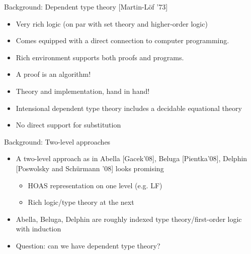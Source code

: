 \documentclass[usenames,dvipsnames]{beamer}
\begin{document}
\begin{frame}{Background: Dependent type theory [Martin-L\"of '73]}
\begin{itemize}
\item Very rich logic (on par with set theory and higher-order logic)
\item Comes equipped with a direct
connection to computer programming.
\item Rich environment supports both proofs and programs.
\item A proof is an algorithm!
\item Theory and implementation, hand in hand!
\item Intensional dependent type theory includes a decidable equational theory
\item No direct support for substitution
\end{itemize}
\end{frame}

\begin{frame}{Background: Two-level approaches}
\begin{itemize}
\item A two-level approach as in Abella [Gacek'08], Beluga [Pientka'08], Delphin [Poswolsky and Sch\"urmann '08] looks promising
\begin{itemize}
\item HOAS representation on one level (e.g. LF)
\item Rich logic/type theory at the next
\end{itemize}
\item Abella, Beluga, Delphin are roughly indexed type theory/first-order logic with induction
\pause \item Question: can we have dependent type theory?
\end{itemize}
\end{frame}
\end{document}
